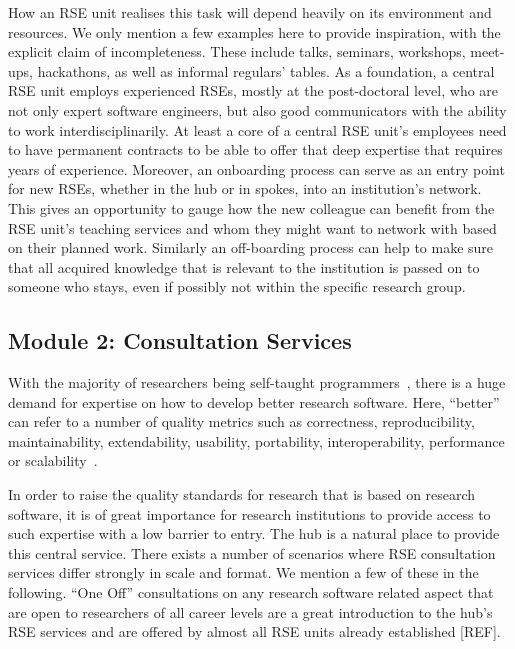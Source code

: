 \documentclass[a4paper]{article}
\makeatletter
\newcommand*{\eg}{e.\,g.\@\xspace}
\makeatother
\begin{document}
How an RSE unit realises this task will depend heavily on its environment and resources.
We only mention a few examples here to provide inspiration, with the explicit claim of incompleteness.
These include talks, seminars, workshops, meet-ups, hackathons, as well as informal regulars' tables.
As a foundation, a central RSE unit employs experienced RSEs, mostly at the post-doctoral level, who are not only expert software engineers, but also good communicators with the ability to work interdisciplinarily.
At least a core of a central RSE unit's employees need to have permanent contracts to be able to offer that deep expertise that requires years of experience.
Moreover, an onboarding process can serve as an entry point for new RSEs, whether in the hub or in spokes, into an institution's network.
This gives an opportunity to gauge how the new colleague can benefit from the RSE unit's teaching services and whom they might want to network with based on their planned work.
Similarly an off-boarding process can help to make sure that all acquired knowledge that is relevant to the institution is passed on to someone who stays, even if possibly not within the specific research group.

\subsection{Module 2: Consultation Services}%
\label{sec:consultation}

With the majority of researchers being self-taught programmers~\autocite{Carver2013}, there is a huge demand for expertise on how to develop better research software.
Here, “better” can refer to a number of quality metrics such as correctness, reproducibility, maintainability, extendability, usability, portability, interoperability, performance or scalability~\autocite[Chapter 16]{Schulmeyer2008}.

In order to raise the quality standards for research that is based on research software, it is of great importance for research institutions to provide access to such expertise with a low barrier to entry.
The hub is a natural place to provide this central service.
There exists a number of scenarios where RSE consultation services differ strongly in scale and format.
We mention a few of these in the following.
“One Off” consultations on any research software related aspect that are open to researchers of all career levels are
a great introduction to the hub's RSE services and are offered by almost all RSE units already established [REF].
\end{document}

